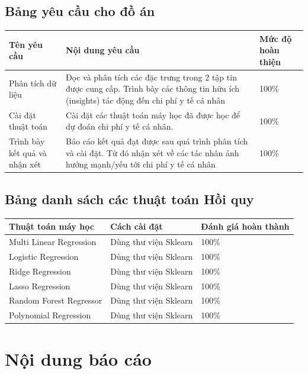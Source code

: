\documentclass{article}
\newcommand\T{\rule{0pt}{2.6ex}}       %
\newcommand\B{\rule[-1.2ex]{0pt}{0pt}} %
\begin{document}
	\subsection{Bảng yêu cầu cho đồ án}
	\begin{table}[H]
		\begin{tabular}{ | p{5cm} | p{6.5cm} | p{3cm} |}\hline	
			Tên yêu cầu & Nội dung yêu cầu & Mức độ hoàn thiện  \T\B\\\hline
			Phân tích dữ liệu & Đọc và phân tích các đặc trưng trong 2 tập tin được cung cấp. Trình bày các thông tin hữu ích (insights) tác động đến chi phí y tế cá nhân & 100\%  \T\B\\\hline
			Cài đặt thuật toán & Cài đặt các thuật toán máy học đã được học để dự đoán chi phí y tế cá nhân. & 100\%  \T\B\\\hline
			Trình bày kết quả và nhận xét & Báo cáo kết quả đạt được sau quá trình phân tích và cài đặt. Từ đó nhận xét về các tác nhân ảnh hưởng mạnh/yếu tới chi phí y tế cá nhân & 100\%  \T\B\\\hline
		\end{tabular}
	\end{table}	
	\subsection{Bảng danh sách các thuật toán Hồi quy}
	\begin{table}[H]
		\begin{tabular}{ | p{5.5cm} | p{5cm} | p{4cm} |} \hline	
			Thuật toán máy học & Cách cài đặt & Đánh giá hoàn thành\T\B\\\hline
			Multi Linear Regression & Dùng thư viện Sklearn & 100\%  \T\B\\\hline
			Logistic Regression & Dùng thư viện Sklearn & 100\%  \T\B\\\hline
			Ridge Regression & Dùng thư viện Sklearn & 100\%  \T\B\\\hline
			Lasso Regression & Dùng thư viện Sklearn & 100\%  \T\B\\\hline
			Random Forest Regressor &Dùng thư viện Sklearn & 100\%  \T\B\\\hline
			Polynomial Regression & Dùng thư viện Sklearn& 100\%  \T\B\\\hline
		\end{tabular}
	\end{table}		
	\section{Nội dung báo cáo}
	
\end{document}
